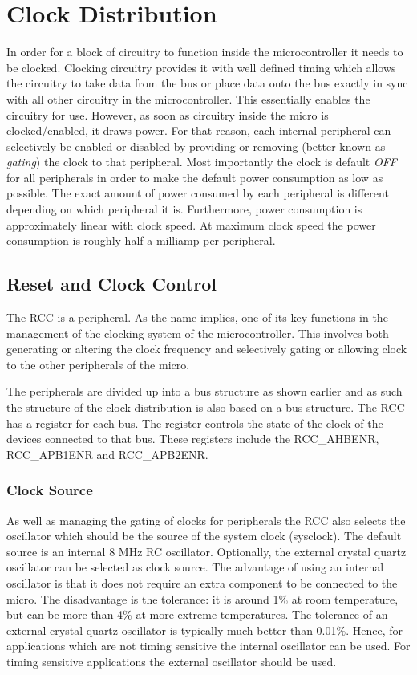 \chapter{Clock Distribution}
In order for a block of circuitry to function inside the microcontroller it needs to be clocked. Clocking circuitry provides it with well defined timing which allows the circuitry to take data from the bus or place data onto the bus exactly in sync with all other circuitry in the microcontroller. This essentially enables the circuitry for use. However, as soon as circuitry inside the micro is clocked/enabled, it draws power. For that reason, each internal peripheral can selectively be enabled or disabled by providing or removing (better known as \emph{gating}) the clock to that peripheral. Most importantly the clock is default \emph{OFF} for all peripherals in order to make the default power consumption as low as possible. The exact amount of power consumed by each peripheral is different depending on which peripheral it is. Furthermore, power consumption is approximately linear with clock speed. At maximum clock speed the power consumption is roughly half a milliamp per peripheral. 

\section{Reset and Clock Control}
The RCC is a peripheral. As the name implies, one of its key functions in the management of the clocking system of the microcontroller. This involves both generating or altering the clock frequency and selectively gating or allowing clock to the other peripherals of the micro. 

The peripherals are divided up into a bus structure as shown earlier and as such the structure of the clock distribution is also based on a bus structure. The RCC has a register for each bus. The register controls the state of the clock of the devices connected to that bus. These registers include the RCC\_AHBENR, RCC\_APB1ENR and RCC\_APB2ENR. 

\subsection{Clock Source}
As well as managing the gating of clocks for peripherals the RCC also selects the oscillator which should be the source of the system clock (sysclock). The default source is an internal 8 MHz RC oscillator. Optionally, the external crystal quartz oscillator can be selected as clock source. The advantage of using an internal oscillator is that it does not require an extra component to be connected to the micro. The disadvantage is the tolerance: it is around 1\% at room temperature, but can be more than 4\% at more extreme temperatures. The tolerance of an external crystal quartz oscillator is typically much better than 0.01\%. Hence, for applications which are not timing sensitive the internal oscillator can be used. For timing sensitive applications the external oscillator should be used. 

